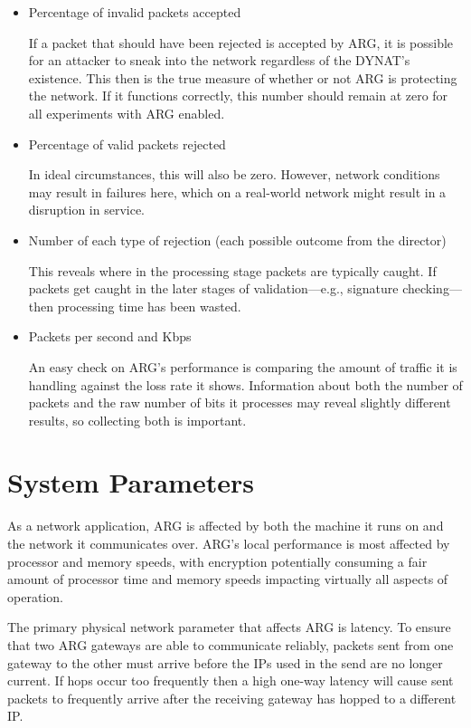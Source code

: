 \begin{itemize}
\item Percentage of invalid packets accepted
	\par If a packet that should have been rejected is accepted by \ac{ARG}, it is possible for an attacker to sneak into the network regardless of the \ac{DYNAT}'s existence. This then is the true measure of whether or not \ac{ARG} is protecting the network. If it functions correctly, this number should remain at zero for all experiments with \ac{ARG} enabled.

\item Percentage of valid packets rejected
	\par In ideal circumstances, this will also be zero. However, network conditions may result in failures here, which on a real-world network might result in a disruption in service. 

\item Number of each type of rejection (each possible outcome from the director)
	\par This reveals where in the processing stage packets are typically caught. If packets get caught in the later stages of validation---e.g., signature checking---then processing time has been wasted.

\item Packets per second and \acf{Kbps}
	\par An easy check on \ac{ARG}'s performance is comparing the amount of traffic it is handling against the loss rate it shows. Information about both the number of packets and the raw number of bits it processes may reveal slightly different results, so collecting both is important.
\end{itemize}

\section{System Parameters}
\label{sec:parameters}
\par As a network application, \ac{ARG} is affected by both the machine it runs on and the network it communicates over. \ac{ARG}'s local performance is most affected by processor and memory speeds, with encryption potentially consuming a fair amount of processor time and memory speeds impacting virtually all aspects of operation.

\par The primary physical network parameter that affects \ac{ARG} is latency. To ensure that two \ac{ARG} gateways are able to communicate reliably, packets sent from one gateway to the other must arrive before the \acp{IP} used in the send are no longer current. If hops occur too frequently then a high one-way latency will cause sent packets to frequently arrive after the receiving gateway has hopped to a different \ac{IP}. 


